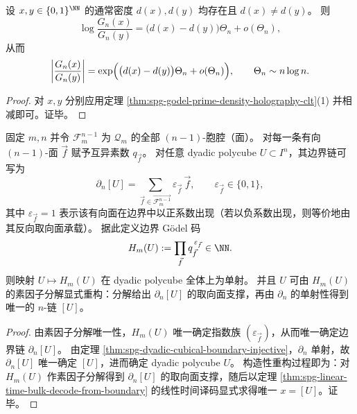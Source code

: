 \begin{corollary}\label{cor:spg-godel-prime-ratio-density}
设 \(x,y\in\{0,1\}^{\NN}\) 的通常密度 \(d(x),d(y)\) 均存在且 \(d(x)\neq d(y)\)。
则
\[
\log\frac{G_n(x)}{G_n(y)}
=
\bigl(d(x)-d(y)\bigr)\Theta_n+o(\Theta_n),
\]
从而
\[
\left|\frac{G_n(x)}{G_n(y)}\right|
=
\exp\Bigl(\bigl(d(x)-d(y)\bigr)\Theta_n+o(\Theta_n)\Bigr),
\qquad
\Theta_n\sim n\log n.
\]
\end{corollary}
\begin{proof}
对 \(x,y\) 分别应用定理 \ref{thm:spg-godel-prime-density-holography-clt}(1) 并相减即可。证毕。
\end{proof}

\begin{theorem}\label{thm:spg-boundary-godelization-holographic-dictionary}
固定 \(m,n\) 并令 \(\mathcal F_{m}^{n-1}\) 为 \(\mathcal Q_m\) 的全部 \((n-1)\)-胞腔（面）。
对每一条有向 \((n-1)\)-面 \(\vec f\) 赋予互异素数 \(q_{\vec f}\)。
对任意 dyadic polycube \(U\subset I^n\)，其边界链可写为
\[
\partial_n[U]=\sum_{\vec f\in \overrightarrow{\mathcal F_{m}^{n-1}}} \varepsilon_{\vec f}\,\vec f,
\qquad \varepsilon_{\vec f}\in\{0,1\},
\]
其中 \(\varepsilon_{\vec f}=1\) 表示该有向面在边界中以正系数出现（若以负系数出现，则等价地由其反向取向面承载）。
据此定义边界 Gödel 码
\[
H_m(U):=\prod_{\vec f} q_{\vec f}^{\,\varepsilon_{\vec f}}\in\NN.
\]
则映射 \(U\mapsto H_m(U)\) 在 dyadic polycube 全体上为单射。
并且 \(U\) 可由 \(H_m(U)\) 的素因子分解显式重构：分解给出 \(\partial_n[U]\) 的取向面支撑，再由 \(\partial_n\) 的单射性得到唯一的 \(n\)-链 \([U]\)。
\end{theorem}
\begin{proof}
由素因子分解唯一性，\(H_m(U)\) 唯一确定指数族 \((\varepsilon_{\vec f})\)，从而唯一确定边界链 \(\partial_n[U]\)。
由定理 \ref{thm:spg-dyadic-cubical-boundary-injective}，\(\partial_n\) 单射，故 \(\partial_n[U]\) 唯一确定 \([U]\)，进而确定 dyadic polycube \(U\)。
构造性重构过程即为：对 \(H_m(U)\) 作素因子分解得到 \(\partial_n[U]\) 的取向面支撑，随后以定理 \ref{thm:spg-linear-time-bulk-decode-from-boundary} 的线性时间译码显式求得唯一 \(x=[U]\)。证毕。
\end{proof}



